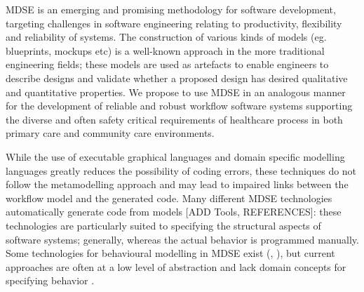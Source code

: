 \documentclass[a4paper]{llncs}
\begin{document}
MDSE is an emerging and promising methodology for software development, targeting challenges in software engineering relating to productivity, flexibility and reliability of systems.  
The construction of various kinds of models (eg. blueprints, mockups etc) is a well-known approach in the more traditional engineering fields; these models are used as artefacts to 
enable engineers to describe designs and validate whether a proposed design has desired qualitative and quantitative properties.  We propose to use MDSE in an analogous manner for 
the development of reliable and robust workflow software systems supporting the diverse and often safety critical requirements of healthcare process in both primary care and 
community care environments.  

While the use of executable graphical languages and domain specific modelling languages greatly reduces the possibility of coding errors, these techniques do not follow the 
metamodelling approach and may lead to impaired links between the workflow model and the generated code.  Many different MDSE technologies automatically generate code from models 
[ADD Tools, REFERENCES]: these technologies are particularly suited to specifying the structural aspects of software systems; generally, whereas the actual behavior is programmed manually.  
Some technologies for behavioural modelling in MDSE exist (\cite{OMG}, \cite{FDT}), but current approaches are often at a low level of abstraction and lack domain concepts for 
specifying behavior \cite{Kindler10}. 
\end{document}
